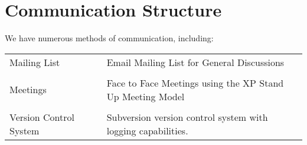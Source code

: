 \documentclass[a4paper,12pt]{article}
\begin{document}
\section{Communication Structure}

We have numerous methods of communication, including:

\begin{tabular}{lll}
Mailing List	&	\hspace{10mm}	&	Email Mailing List for General Discussions	\\
	&	&	\\
Meetings	&	&	Face to Face Meetings using the XP Stand Up Meeting Model	\\
	&	&	\\
Version Control System	&	&	Subversion version control system with logging capabilities.
\end{tabular}
\end{document}
